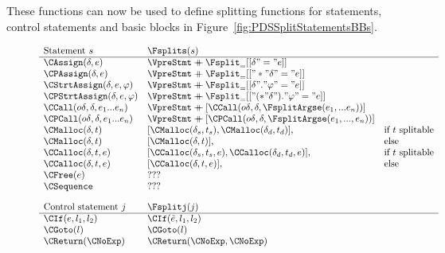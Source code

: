 \begin{docpart}
These functions can now be used to define splitting functions for
statements, control statements and basic blocks in
Figure~\ref{fig:PDSSplitStatementsBBs}.
\begin{figure}[htbp]
  \begin{center}
\[
    \begin{array}{lll}
      \textnormal{Statement } s       & \Fsplits(s) \\\hline
      \CAssign(\delta,e)              & \VpreStmt \append 
                                        \Fsplit_{=}[[\delta" = "e]] \\
      \CPAssign(\delta,e)             & \VpreStmt \append 
                                        \Fsplit_{=}[["*"\delta" = "e]] \\
      \CStrtAssign(\delta,e,\varphi)  
         & \VpreStmt \append 
           \Fsplit_{=}[[\delta"."\varphi" = "e]] \\
      \CPStrtAssign(\delta,e,\varphi) 
         & \VpreStmt \append 
           \Fsplit_{=}[["(*"\delta")."\varphi" = "e]] \\
      \CCall(\optdelta,\delta,e_1...e_n)
         & \VpreStmt \append 
           [\CCall(\optdelta,\delta, \FsplitArgse(e_1,...e_n))] \\
      \CPCall(\optdelta,\delta,e_1...e_n)
         & \VpreStmt \append 
           [\CPCall(\optdelta,\delta, \FsplitArgse(e_1,...,e_n))] \\
      \CMalloc(\delta,t)
         & [\CMalloc(\delta_s,t_s), \CMalloc(\delta_d,t_d)], 
         & \textnormal{if $t$ splitable} \\
      \CMalloc(\delta,t)
         & [\CMalloc(\delta,t)], 
         & \textnormal{else}\\
      \CCalloc(\delta,t,e)            
         & [\CCalloc(\delta_s,t_s,e), \CCalloc(\delta_d,t_d,e)],
         & \textnormal{if $t$ splitable} \\
      \CCalloc(\delta,t,e)            
         & [\CCalloc(\delta,t,e)],
         & \textnormal{else} \\
      \CFree(e)                       & ??? \\
      \CSequence                      & ??? 
      \\[1em]
      \textnormal{Control statement } j & \Fsplitj(j) \\\hline
      \CIf(e,l_1,l_2)   & \CIf(\tilde{e},l_1,l_2) \\
      \CGoto(l)         & \CGoto(l) \\
      \CReturn(\CNoExp) & \CReturn(\CNoExp, \CNoExp) \\

\end{array}\]
\end{center}
\end{figure}
\end{docpart}
